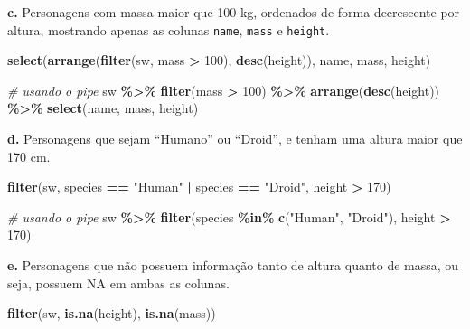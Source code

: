 \documentclass[
]{book}
\newenvironment{Shaded}{\begin{snugshade}}{\end{snugshade}}
\newcommand{\CommentTok}[1]{\textcolor[rgb]{0.56,0.35,0.01}{\textit{#1}}}
\newcommand{\DecValTok}[1]{\textcolor[rgb]{0.00,0.00,0.81}{#1}}
\newcommand{\FunctionTok}[1]{\textcolor[rgb]{0.13,0.29,0.53}{\textbf{#1}}}
\newcommand{\NormalTok}[1]{#1}
\newcommand{\SpecialCharTok}[1]{\textcolor[rgb]{0.81,0.36,0.00}{\textbf{#1}}}
\newcommand{\StringTok}[1]{\textcolor[rgb]{0.31,0.60,0.02}{#1}}
\begin{document}
\textbf{c.} Personagens com massa maior que 100 kg, ordenados de forma
decrescente por altura, mostrando apenas as colunas \texttt{name}, \texttt{mass} e
\texttt{height}.

\begin{Shaded}
\begin{Highlighting}[]
\FunctionTok{select}\NormalTok{(}\FunctionTok{arrange}\NormalTok{(}\FunctionTok{filter}\NormalTok{(sw, mass }\SpecialCharTok{\textgreater{}} \DecValTok{100}\NormalTok{), }\FunctionTok{desc}\NormalTok{(height)), name, mass, height)}

\CommentTok{\# usando o pipe}
\NormalTok{sw }\SpecialCharTok{\%\textgreater{}\%} 
  \FunctionTok{filter}\NormalTok{(mass }\SpecialCharTok{\textgreater{}} \DecValTok{100}\NormalTok{) }\SpecialCharTok{\%\textgreater{}\%} 
  \FunctionTok{arrange}\NormalTok{(}\FunctionTok{desc}\NormalTok{(height)) }\SpecialCharTok{\%\textgreater{}\%} 
  \FunctionTok{select}\NormalTok{(name, mass, height)}
\end{Highlighting}
\end{Shaded}

\textbf{d.} Personagens que sejam ``Humano'' ou ``Droid'', e tenham uma altura
maior que 170 cm.

\begin{Shaded}
\begin{Highlighting}[]
\FunctionTok{filter}\NormalTok{(sw, species }\SpecialCharTok{==} \StringTok{"Human"} \SpecialCharTok{|}\NormalTok{ species }\SpecialCharTok{==} \StringTok{"Droid"}\NormalTok{, height }\SpecialCharTok{\textgreater{}} \DecValTok{170}\NormalTok{)}

\CommentTok{\# usando o pipe}
\NormalTok{sw }\SpecialCharTok{\%\textgreater{}\%} 
  \FunctionTok{filter}\NormalTok{(species }\SpecialCharTok{\%in\%} \FunctionTok{c}\NormalTok{(}\StringTok{"Human"}\NormalTok{, }\StringTok{"Droid"}\NormalTok{), height }\SpecialCharTok{\textgreater{}} \DecValTok{170}\NormalTok{)}
\end{Highlighting}
\end{Shaded}

\textbf{e.} Personagens que não possuem informação tanto de altura quanto de
massa, ou seja, possuem NA em ambas as colunas.

\begin{Shaded}
\begin{Highlighting}[]
\FunctionTok{filter}\NormalTok{(sw, }\FunctionTok{is.na}\NormalTok{(height), }\FunctionTok{is.na}\NormalTok{(mass))}
\end{Highlighting}
\end{Shaded}
\end{document}
